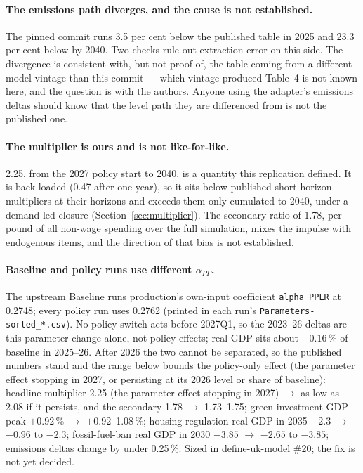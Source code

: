\paragraph{The emissions path diverges, and the cause is not established.} The pinned commit runs 3.5 per cent below the published table in 2025 and 23.3 per cent below by 2040. Two checks rule out extraction error on this side. The divergence is consistent with, but not proof of, the table coming from a different model vintage than this commit --- which vintage produced Table~4 is not known here, and the question is with the authors. Anyone using the adapter's emissions deltas should know that the level path they are differenced from is not the published one.

\paragraph{The multiplier is ours and is not like-for-like.} 2.25, from the 2027 policy start to 2040, is a quantity this replication defined. It is back-loaded (0.47 after one year), so it sits below published short-horizon multipliers at their horizons and exceeds them only cumulated to 2040, under a demand-led closure (Section~\ref{sec:multiplier}). The secondary ratio of 1.78, per pound of all non-wage spending over the full simulation, mixes the impulse with endogenous items, and the direction of that bias is not established.

\paragraph{Baseline and policy runs use different $\alpha_{PP}$.} The upstream Baseline runs production's own-input coefficient \texttt{alpha\_PPLR} at 0.2748; every policy run uses 0.2762 (printed in each run's \texttt{Parameters-sorted\_*.csv}). No policy switch acts before 2027Q1, so the 2023--26 deltas are this parameter change alone, not policy effects; real GDP sits about $-0.16$\,\% of baseline in 2025--26. After 2026 the two cannot be separated, so the published numbers stand and the range below bounds the policy-only effect (the parameter effect stopping in 2027, or persisting at its 2026 level or share of baseline): headline multiplier 2.25 (the parameter effect stopping in 2027) $\rightarrow$ as low as 2.08 if it persists, and the secondary 1.78 $\rightarrow$ 1.73--1.75; green-investment GDP peak $+0.92$\,\% $\rightarrow$ $+0.92$--1.08\,\%; housing-regulation real GDP in 2035 $-2.3$ $\rightarrow$ $-0.96$ to $-2.3$; fossil-fuel-ban real GDP in 2030 $-3.85$ $\rightarrow$ $-2.65$ to $-3.85$; emissions deltas change by under 0.25\,\%. Sized in define-uk-model \#20; the fix is not yet decided.


